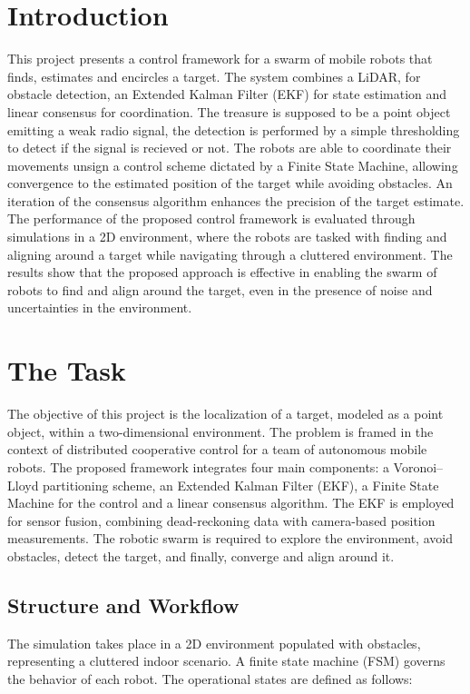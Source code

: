 \documentclass[times, twoside]{zHenriquesLab-StyleBioRxiv}
\begin{document}
\section*{Introduction}
This project presents a control framework for a swarm of mobile robots
that finds, estimates and encircles a target. The system combines a
LiDAR, for obstacle detection, an Extended Kalman Filter (EKF) for state
estimation and linear consensus for coordination. The treasure is supposed to be a point object emitting a weak radio signal, the detection is performed by a
simple thresholding to detect if the signal is recieved or not. The robots are able
to coordinate their movements unsign a control scheme dictated by a Finite State Machine, allowing convergence to the estimated position of the target
while avoiding obstacles. An iteration of the consensus algorithm enhances the precision of the target estimate. The performance of the proposed control
framework is evaluated through simulations in a 2D environment,
where the robots are tasked with finding and aligning around a target
while navigating through a cluttered environment. The results show
that the proposed approach is effective in enabling the swarm of robots
to find and align around the target, even in the presence of noise and
uncertainties in the environment.

\section*{The Task}

The objective of this project is the localization of a target, modeled as a point object, within a two-dimensional environment. The problem is framed in the context of distributed cooperative control for a team of autonomous mobile robots.
The proposed framework integrates four main components: a Voronoi--Lloyd partitioning scheme, an Extended Kalman Filter (EKF), a Finite State Machine for the control and a linear consensus algorithm. The EKF is employed for sensor fusion, combining dead-reckoning data with camera-based position measurements. The robotic swarm is required to explore the environment, avoid obstacles, detect the target, and finally, converge and align around it.

\subsection*{Structure and Workflow}

The simulation takes place in a 2D environment populated with obstacles, representing a cluttered indoor scenario. A finite state machine (FSM) governs the behavior of each robot. The operational states are defined as follows:
\end{document}

